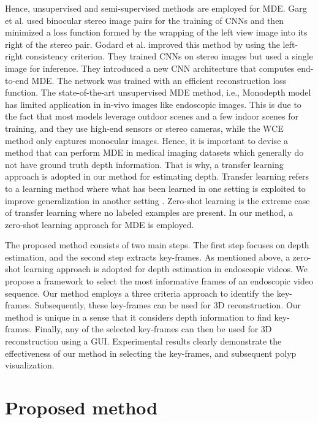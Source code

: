 \documentclass[journal]{IEEEtran}
\begin{document}
Hence, unsupervised and semi-supervised methods are employed for MDE. Garg et al. \cite{garg2016unsupervised} used binocular stereo image pairs for the training of CNNs and then minimized a loss function formed by the wrapping of the left view image into its right of the stereo pair. Godard et al. \cite{godard2017unsupervised} improved this method by using the left-right consistency criterion. 
They trained CNNs on stereo images but used a single image for inference. They introduced a new CNN architecture that computes end-to-end MDE. The network was trained with an efficient reconstruction loss function.
The state-of-the-art unsupervised MDE method, i.e., Monodepth \cite{godard2017unsupervised} model has limited application in in-vivo images like endoscopic images. This is due to the fact that most models leverage outdoor scenes \cite{geigerwe} and a few indoor scenes \cite{saxena2007learning} for training, and they use high-end sensors or stereo cameras, while the WCE method only captures monocular images. Hence, it is important to devise a method that can perform MDE in medical imaging datasets which generally do not have ground truth depth information. That is why, a transfer learning approach is adopted in our method for estimating depth. Transfer learning refers to a learning method where what has been learned in one setting is exploited to improve generalization in another setting \cite{goodfellow2016deep}. Zero-shot learning is the extreme case of transfer learning where no labeled examples are present. In our method, a zero-shot learning approach for MDE \cite{lasinger2019towards} is employed.

The proposed method consists of two main steps. The first step focuses on depth estimation, and the second step extracts key-frames. As mentioned above, a zero-shot learning approach is adopted for depth estimation in endoscopic videos. We propose a framework to select the most informative frames of an endoscopic video sequence. Our method employs a three criteria approach to identify the key-frames. Subsequently, these key-frames can be used for 3D reconstruction. Our method is unique in a sense that it considers depth information to find key-frames. Finally, any of the selected key-frames can then be used for 3D reconstruction using a GUI. Experimental results clearly demonstrate the effectiveness of our method in selecting the key-frames, and subsequent polyp visualization.



\section{Proposed method}
\end{document}
